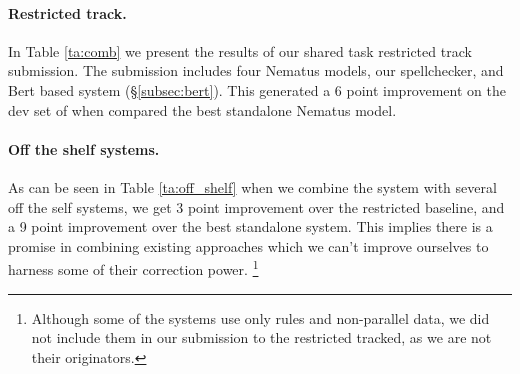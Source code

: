 \documentclass[11pt,a4paper]{article}
\begin{document}
\paragraph{Restricted track.} In Table \ref{ta:comb} we present the results of our shared task restricted track submission. The submission includes four Nematus models, our spellchecker, and Bert based system (\S \ref{subsec:bert}). This generated a 6 point improvement on the dev set of  when compared the best standalone Nematus model.

\begin{table}[htb]
\caption{Performance of systems and iterative combination of them. Combination improves both precision and recall even using low performing systems.\label{ta:comb}}
\end{table}
\paragraph{Off the shelf systems.} As can be seen in Table \ref{ta:off_shelf} when we combine the system with several off the self systems, we get 3 point improvement over the restricted baseline, and a 9 point improvement over the best standalone system. This implies there is a promise in combining existing approaches which we can't improve ourselves to harness some of their correction power. \footnote{Although some of the systems use only rules and non-parallel data, we did not include them in our submission to the restricted tracked, as we are not their originators.}
\end{document}
